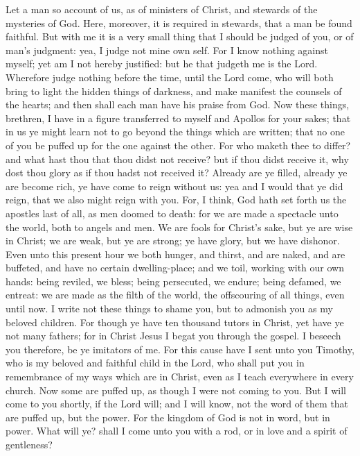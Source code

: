 Let a man so account of us, as of ministers of Christ, and stewards of the mysteries of God. Here, moreover, it is required in stewards, that a man be found faithful. But with me it is a very small thing that I should be judged of you, or of man’s judgment: yea, I judge not mine own self. For I know nothing against myself; yet am I not hereby justified: but he that judgeth me is the Lord. Wherefore judge nothing before the time, until the Lord come, who will both bring to light the hidden things of darkness, and make manifest the counsels of the hearts; and then shall each man have his praise from God.  Now these things, brethren, I have in a figure transferred to myself and Apollos for your sakes; that in us ye might learn not to go beyond the things which are written; that no one of you be puffed up for the one against the other. For who maketh thee to differ? and what hast thou that thou didst not receive? but if thou didst receive it, why dost thou glory as if thou hadst not received it? Already are ye filled, already ye are become rich, ye have come to reign without us: yea and I would that ye did reign, that we also might reign with you. For, I think, God hath set forth us the apostles last of all, as men doomed to death: for we are made a spectacle unto the world, both to angels and men. We are fools for Christ’s sake, but ye are wise in Christ; we are weak, but ye are strong; ye have glory, but we have dishonor. Even unto this present hour we both hunger, and thirst, and are naked, and are buffeted, and have no certain dwelling-place; and we toil, working with our own hands: being reviled, we bless; being persecuted, we endure; being defamed, we entreat: we are made as the filth of the world, the offscouring of all things, even until now.  I write not these things to shame you, but to admonish you as my beloved children. For though ye have ten thousand tutors in Christ, yet have ye not many fathers; for in Christ Jesus I begat you through the gospel. I beseech you therefore, be ye imitators of me. For this cause have I sent unto you Timothy, who is my beloved and faithful child in the Lord, who shall put you in remembrance of my ways which are in Christ, even as I teach everywhere in every church. Now some are puffed up, as though I were not coming to you. But I will come to you shortly, if the Lord will; and I will know, not the word of them that are puffed up, but the power. For the kingdom of God is not in word, but in power. What will ye? shall I come unto you with a rod, or in love and a spirit of gentleness? 

